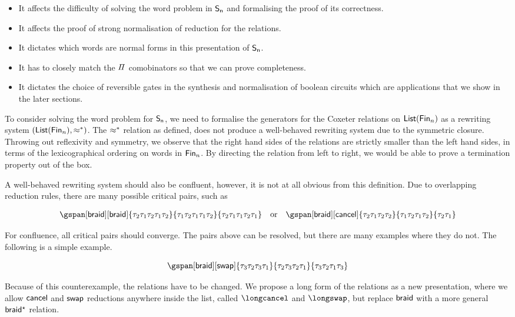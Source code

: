 \begin{itemize}
  \item It affects the difficulty of solving the word problem in $\Sn$ and
        formalising the proof of its correctness.
  \item It affects the proof of strong normalisation of reduction for the relations.
  \item It dictates which words are normal forms in this presentation of $\Sn$.
  \item It has to closely match the $\PiLang$ comobinators so that we can prove
        completeness.
  \item It dictates the choice of reversible gates in the synthesis and
        normalisation of boolean circuits which are applications that we show in
        the later sections.
\end{itemize}

To consider solving the word problem for $\Sn$, we need to formalise the generators for the Coxeter relations on
$\List[\Fin[n]]$ as a rewriting system $(\List[\Fin[n]],\cox*)$. The $\cox*$ relation as defined, does not produce a
well-behaved rewriting system due to the symmetric closure. Throwing out reflexivity and symmetry, we observe that the
right hand sides of the relations are strictly smaller than the left hand sides, in terms of the lexicographical
ordering on words in $\Fin[n]$. By directing the relation from left to right, we would be able to prove a termination
property out of the box.

A well-behaved rewriting system should also be confluent, however, it is not at all obvious from this definition. Due to
overlapping reduction rules, there are many possible critical pairs, such as

\[
  \begin{array}{lcr}
    \gspan[\braid][\braid]{\tau_2\tau_1\tau_2\tau_1\tau_2}{\tau_1\tau_2\tau_1\tau_1\tau_2}{\tau_2\tau_1\tau_1\tau_2\tau_1}
     &
    \text{or}
     &
    \gspan[\braid][\cancel]{\tau_2\tau_1\tau_2\tau_2}{\tau_1\tau_2\tau_1\tau_2}{\tau_2\tau_1}
  \end{array}
\]

For confluence, all critical pairs should converge. The pairs above can be resolved, but there are many examples where
they do not. The following is a simple example.

\[
  \gspan[\braid][\swap]{\tau_3\tau_2\tau_3\tau_1}{\tau_2\tau_3\tau_2\tau_1}{\tau_3\tau_2\tau_1\tau_3}
\]

Because of this counterexample, the relations have to be changed. We propose a long form of the relations as a new
presentation, where we allow $\cancel$ and $\swap$ reductions anywhere inside the list, called $\longcancel$ and
$\longswap$, but replace $\braid$ with a more general $\longbraid$ relation.

